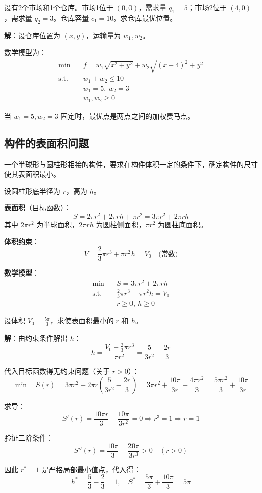 \begin{example}[选址问题建模]
设有2个市场和1个仓库。市场1位于 $(0, 0)$，需求量 $q_1 = 5$；市场2位于 $(4, 0)$，需求量 $q_2 = 3$。仓库容量 $c_1 = 10$。求仓库最优位置。

\textbf{解}：设仓库位置为 $(x, y)$，运输量为 $w_1, w_2$。

数学模型为：
\begin{align*}
\min\quad & f = w_1 \sqrt{x^2 + y^2} + w_2 \sqrt{(x-4)^2 + y^2} \\
\text{s.t.}\quad & w_1 + w_2 \leq 10 \\
& w_1 = 5,\ w_2 = 3 \\
& w_1, w_2 \geq 0
\end{align*}

当 $w_1=5, w_2=3$ 固定时，最优点是两点之间的加权费马点。
\end{example}

\subsection{构件的表面积问题}

\begin{conceptbox}[问题描述]
一个半球形与圆柱形相接的构件，要求在构件体积一定的条件下，确定构件的尺寸使其表面积最小。
\end{conceptbox}

设圆柱形底半径为 $r$，高为 $h$。

\textbf{表面积}（目标函数）：
\[
S = 2\pi r^2 + 2\pi rh + \pi r^2 = 3\pi r^2 + 2\pi rh
\]
其中 $2\pi r^2$ 为半球面积，$2\pi rh$ 为圆柱侧面积，$\pi r^2$ 为圆柱底面积。

\textbf{体积约束}：
\[
V = \frac{2}{3}\pi r^3 + \pi r^2 h = V_0 \quad \text{(常数)}
\]

\textbf{数学模型}：
\[
\begin{aligned}
\min\quad & S = 3\pi r^2 + 2\pi rh \\
\text{s.t.}\quad & \frac{2}{3}\pi r^3 + \pi r^2 h = V_0 \\
& r \geq 0,\ h \geq 0
\end{aligned}
\]

\begin{example}[构件表面积问题求解]
设体积 $V_0 = \frac{5\pi}{3}$，求使表面积最小的 $r$ 和 $h$。

\textbf{解}：由约束条件解出 $h$：
\[
h = \frac{V_0 - \frac{2}{3}\pi r^3}{\pi r^2} = \frac{5}{3r^2} - \frac{2r}{3}
\]

代入目标函数得无约束问题（关于 $r > 0$）：
\[
\min\quad S(r) = 3\pi r^2 + 2\pi r\left(\frac{5}{3r^2} - \frac{2r}{3}\right) = 3\pi r^2 + \frac{10\pi}{3r} - \frac{4\pi r^2}{3} = \frac{5\pi r^2}{3} + \frac{10\pi}{3r}
\]

求导：
\[
S'(r) = \frac{10\pi r}{3} - \frac{10\pi}{3r^2} = 0 \Rightarrow r^3 = 1 \Rightarrow r = 1
\]

验证二阶条件：
\[
S''(r) = \frac{10\pi}{3} + \frac{20\pi}{3r^3} > 0 \quad (r > 0)
\]

因此 $r^* = 1$ 是严格局部最小值点，代入得：
\[
h^* = \frac{5}{3} - \frac{2}{3} = 1,\quad S^* = \frac{5\pi}{3} + \frac{10\pi}{3} = 5\pi
\]
\end{example}

